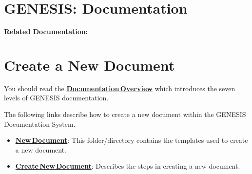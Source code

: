 \documentclass[12pt]{article}
\begin{document}
\section*{GENESIS: Documentation}

{\bf Related Documentation:}

\section*{Create a New Document}

You should read the \href{../documentation-overview/documentation-overview.tex}{\bf Documentation\,Overview} which introduces the seven levels of GENESIS documentation.

The following links describe how to create a new document within the GENESIS Documentation System.
\begin{itemize}
   \item[]\href{../NewDocument/NewDocument.tex}{\bf New\,Document}: This folder/directory contains the templates used to create a new document.
   \item[]\href{../document-create/document-create.tex}{\bf Create\,New\,Document}: Describes the steps in creating a new document.
\end{itemize}
\end{document}
